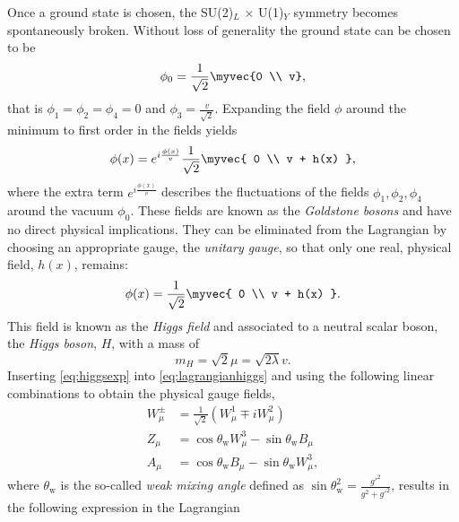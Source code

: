 Once a ground state is chosen, the SU(2)$_L$ $\times$ U(1)$_Y$ symmetry becomes spontaneously broken.
Without loss of generality the ground state can be chosen to be
\begin{equation}
  \phi_0 = \frac{1}{\sqrt{2}} \myvec{0 \\ v},
  \label{eq:groundstate}
\end{equation}
that is $\phi_1 = \phi_2 = \phi_4 = 0$ and $\phi_3 = \frac{v}{\sqrt{2}}$. 
Expanding the field $\phi$ around the minimum to first order in the fields yields
\begin{equation}
  \phi(x) = e^{i\frac{\phi(x)}{v}}\frac{1}{\sqrt{2}} \myvec{ 0 \\ v + h(x) },
    \label{eq:higgsexp}
\end{equation}
where the extra term $e^{i\frac{\phi(x)}{v}}$ describes the fluctuations of the fields $\phi_1, \phi_2, \phi_4$ around the vacuum $\phi_0$.
These fields are known as the \emph{Goldstone bosons} and have no direct physical implications. They can be eliminated from the Lagrangian by choosing an appropriate gauge, the \emph{unitary gauge}, so that only one real, physical field, $h(x)$, remains:
\begin{equation}
  \phi(x) = \frac{1}{\sqrt{2}} \myvec{ 0 \\ v + h(x) }.
  \label{eq:expanded-groundstate}
\end{equation}
This field is known as the \emph{Higgs field} and associated to a neutral scalar boson, the \emph{Higgs boson}, $H$, with a mass of 
\begin{equation}
  m_H = \sqrt{2} \mu = \sqrt{2 \lambda} v.
\end{equation}
Inserting \cref{eq:higgsexp} into \cref{eq:lagrangianhiggs} and using the following linear combinations to obtain the physical gauge fields,
\begin{align}
  W_\mu^\pm &= \frac{1}{\sqrt{2}} \left( W_\mu^1 \mp iW_\mu^2 \right) \\
  Z_\mu &= \cos\theta_\text{w} W_\mu^3 - \sin\theta_\text{w} B_\mu \\
  A_\mu &= \cos\theta_\text{w} B_\mu - \sin\theta_\text{w} W_\mu^3,
\end{align}
where $\theta_\text{w}$ is the so-called \emph{weak mixing angle} defined as $\sin\theta_\text{w}^2 = \frac{g'^2}{g^2+g'^2}$, results in the following expression in the Lagrangian
